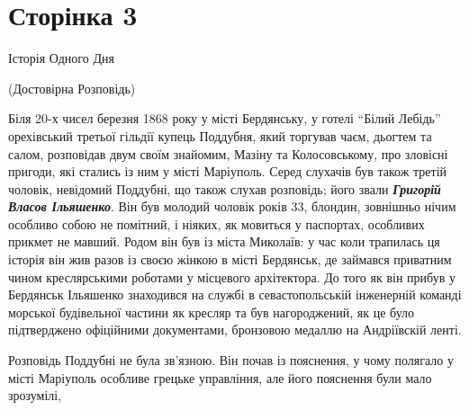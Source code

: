\ifpages\section{Сторінка 3}\else\fi
Історія Одного Дня 

(Достовірна Розповідь)

Біля 20-х чисел березня 1868 року у місті Бердянську, у готелі ``Білий Лебідь'' орехівський
третьої гільдії купець Поддубня, який торгував чаєм, дьогтем та салом, розповідав двум своїм
знайомим, Мазіну та Колосовському, про зловісні пригоди, які стались із ним у місті Маріуполь. Серед
слухачів був також третій чоловік, невідомий Поддубні, що також слухав
розповідь; його звали \textbf{\em Григорій Власов Ільяшенко}. Він був молодий чоловік років 33, блондин,
зовнішньо нічим особливо собою не помітний, і ніяких, як мовиться у паспортах, особливих прикмет не мавший.
Родом він був із міста Миколаїв: у час коли трапилась ця історія він жив разов із своєю жінкою в місті Бердянськ, 
де займався приватним чином креслярськими роботами у місцевого архітектора. До того як він прибув у Бердянськ Ільяшенко
знаходився на службі в севастопольській інженерній команді морської будівельної частини як кресляр та був нагороджений,
як це було підтверджено офіційними документами, бронзовою медаллю на Андріївскій ленті.

Розповідь Поддубні не була зв'язною. Він почав із пояснення, у чому полягало у місті Маріуполь особливе
грецьке управління, але його пояснення були мало зрозумілі, 
